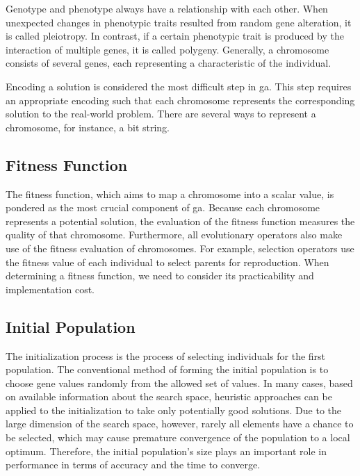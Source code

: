 Genotype and phenotype always have a relationship with each other. When unexpected changes in phenotypic traits resulted from random gene alteration, it is called pleiotropy. In contrast, if a certain phenotypic trait is produced by the interaction of multiple genes, it is called polygeny. Generally, a chromosome consists of several genes, each representing a characteristic of the individual.

Encoding a solution is considered the most difficult step in \gls{ga}. This step requires an appropriate encoding such that each chromosome represents the corresponding solution to the real-world problem. There are several ways to represent a chromosome, for instance, a bit string.

\subsection {Fitness Function}
\label{ga:fitness}
The fitness function, which aims to map a chromosome into a scalar value, is pondered as the most crucial component of \gls{ga}. Because each chromosome represents a potential solution, the evaluation of the fitness function measures the quality of that chromosome. Furthermore, all evolutionary operators also make use of the fitness evaluation of chromosomes. For example, selection operators use the fitness value of each individual to select parents for reproduction. When determining a fitness function, we need to consider its practicability and implementation cost.

\subsection {Initial Population}
\label{ga:init}
The initialization process is the process of selecting individuals for the first population. The conventional method of forming the initial population is to choose gene values randomly from the allowed set of values. In many cases, based on available information about the search space, heuristic approaches can be applied to the initialization to take only potentially good solutions. Due to the large dimension of the search space, however, rarely all elements have a chance to be selected, which may cause premature convergence of the population to a local optimum. Therefore, the initial population's size plays an important role in performance in terms of accuracy and the time to converge.


